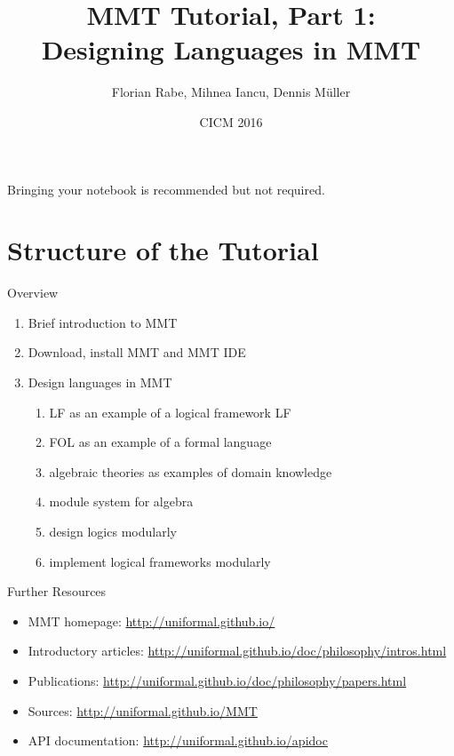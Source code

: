 \documentclass{beamer}
\begin{document}
\title{MMT Tutorial, Part 1: \\ Designing Languages in MMT}
\author{Florian Rabe, Mihnea Iancu, Dennis M\"uller}
\date{CICM 2016}
\begin{frame}
    \titlepage 
\begin{center}
Bringing your notebook is recommended but not required.
\end{center}
\end{frame}


\section{Structure of the Tutorial}

\begin{myframe}{Overview}
\begin{enumerate}
 \item Brief introduction to MMT
 \item Download, install MMT and MMT IDE
 \item Design languages in MMT
   \begin{enumerate}
     \item LF as an example of a logical framework LF
     \item FOL as an example of a formal language
     \item algebraic theories as examples of domain knowledge
     \item module system for algebra
     \item design logics modularly
     \item implement logical frameworks modularly
   \end{enumerate}
 \end{enumerate}
\end{myframe}

\begin{myframe}{Further Resources}
\begin{itemize}
  \item MMT homepage: \url{http://uniformal.github.io/}
  \item Introductory articles: \url{http://uniformal.github.io/doc/philosophy/intros.html}
  \item Publications: \url{http://uniformal.github.io/doc/philosophy/papers.html}
  \item Sources:  \url{http://uniformal.github.io/MMT}
  \item API documentation:  \url{http://uniformal.github.io/apidoc}
\end{itemize}
\end{myframe}
\end{document}

